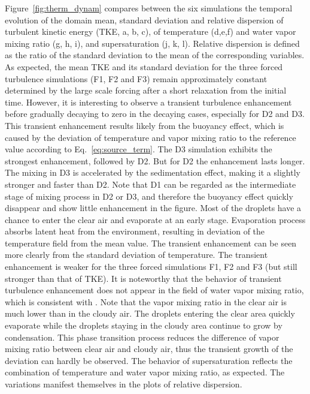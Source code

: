 \documentclass[draft,linenumbers]{agujournal}
\newcommand{\Eq}[1]{Eq.~\eqref{#1}}
\newcommand{\Fig}[1]{Figure~\ref{#1}}
\begin{document}
\Fig{fig:therm_dynam} compares between the six simulations the temporal evolution of the domain mean, standard deviation and relative dispersion of turbulent kinetic energy (TKE, a, b, c), of temperature (d,e,f) and water vapor mixing ratio (g, h, i), and supersaturation (j, k, l). Relative dispersion is defined as the ratio of the standard deviation to the mean of the corresponding variables. As expected, the mean TKE and its standard deviation for the three forced turbulence simulations (F1, F2 and F3) remain approximately constant determined by the large scale forcing after a short relaxation from the initial time. However, it is interesting to observe a transient turbulence enhancement before gradually decaying to zero in the decaying cases, especially for D2 and D3. This transient enhancement results likely from the buoyancy effect, which is caused by the deviation of temperature and vapor mixing ratio to the reference value according to \Eq{eq:source_term}. The D3 simulation exhibits the strongest enhancement, followed by D2. But for D2 the enhancement lasts longer. The mixing in D3 is accelerated by the sedimentation effect, making it a slightly stronger and faster than D2. Note that D1 can be regarded as the intermediate stage of mixing process in D2 or D3, and therefore the buoyancy effect quickly disappear and show little enhancement in the figure.  Most of the droplets have a chance to enter the clear air and evaporate at an early stage. Evaporation process absorbs latent heat from the environment, resulting in deviation of the temperature field from the mean value. The transient enhancement can be seen more clearly from the standard deviation of temperature. The transient enhancement is weaker for the three forced simulations F1, F2 and F3 (but still stronger than that of TKE).  It is noteworthy that the behavior of transient turbulence enhancement does not appear in the field of water vapor mixing ratio, which is consistent with \citet{Kumar14}. Note that the vapor mixing ratio in the clear air is much lower than in the cloudy air. The droplets entering the clear area quickly evaporate while the droplets staying in the cloudy area continue to grow by condensation. This phase transition process reduces the difference of vapor mixing ratio between clear air and cloudy air, thus the transient growth of the deviation can hardly be observed.  The behavior of supersaturation reflects the combination of temperature and water vapor mixing ratio, as expected. The variations manifest themselves in the plots of relative dispersion.
\end{document}

